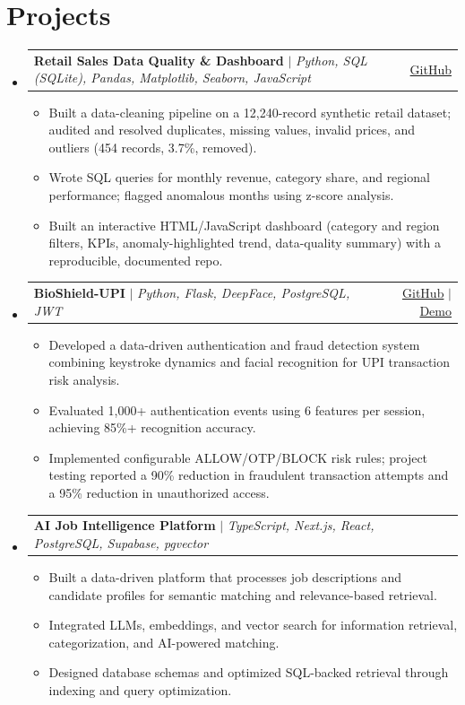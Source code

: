 \documentclass[letterpaper,10pt]{article}
\makeatletter
\newcommand{\resumeItem}[1]{\item\small{#1 \vspace{-2pt}}}
\newcommand{\resumeProjectHeading}[2]{\item
  \begin{tabular*}{0.97\textwidth}{l@{\extracolsep{\fill}}r}\small #1 & \small #2 \\ \end{tabular*}\vspace{-7pt}}
\newcommand{\resumeSubHeadingListStart}{\begin{itemize}[leftmargin=0.15in,label={},topsep=2pt,itemsep=1pt]}
\newcommand{\resumeSubHeadingListEnd}{\end{itemize}}
\newcommand{\resumeItemListStart}{\begin{itemize}[leftmargin=0.18in,label=\textbullet,topsep=2pt,itemsep=1pt,parsep=0pt]}
\newcommand{\resumeItemListEnd}{\end{itemize}\vspace{-5pt}}
\makeatother
\begin{document}
\section{Projects}
\resumeSubHeadingListStart

  \resumeProjectHeading
    {\textbf{Retail Sales Data Quality \& Dashboard} $|$
    \emph{Python, SQL (SQLite), Pandas, Matplotlib, Seaborn, JavaScript}}
    {\href{https://github.com/ujjwalg2611/retail-sales-analysis}{GitHub}}
  \resumeItemListStart
    \resumeItem{Built a data-cleaning pipeline on a 12,240-record synthetic retail dataset; audited and
    resolved duplicates, missing values, invalid prices, and outliers (454 records, 3.7\%, removed).}
    \resumeItem{Wrote SQL queries for monthly revenue, category share, and regional performance;
    flagged anomalous months using z-score analysis.}
    \resumeItem{Built an interactive HTML/JavaScript dashboard (category and region filters, KPIs,
    anomaly-highlighted trend, data-quality summary) with a reproducible, documented repo.}
  \resumeItemListEnd

  \resumeProjectHeading
    {\textbf{BioShield-UPI} $|$ \emph{Python, Flask, DeepFace, PostgreSQL, JWT}}
    {\href{https://github.com/ujjwalg2611/BioShield-UPI}{GitHub} $|$
     \href{https://bioshield-upi.onrender.com/}{Demo}}
  \resumeItemListStart
    \resumeItem{Developed a data-driven authentication and fraud detection system combining keystroke
    dynamics and facial recognition for UPI transaction risk analysis.}
    \resumeItem{Evaluated 1,000+ authentication events using 6 features per session, achieving
    85\%+ recognition accuracy.}
    \resumeItem{Implemented configurable ALLOW/OTP/BLOCK risk rules; project testing reported a
    90\% reduction in fraudulent transaction attempts and a 95\% reduction in unauthorized access.}
  \resumeItemListEnd

  \resumeProjectHeading
    {\textbf{AI Job Intelligence Platform} $|$
    \emph{TypeScript, Next.js, React, PostgreSQL, Supabase, pgvector}}{}
  \resumeItemListStart
    \resumeItem{Built a data-driven platform that processes job descriptions and candidate profiles
    for semantic matching and relevance-based retrieval.}
    \resumeItem{Integrated LLMs, embeddings, and vector search for information retrieval,
    categorization, and AI-powered matching.}
    \resumeItem{Designed database schemas and optimized SQL-backed retrieval through indexing
    and query optimization.}
  \resumeItemListEnd
\resumeSubHeadingListEnd
\end{document}
